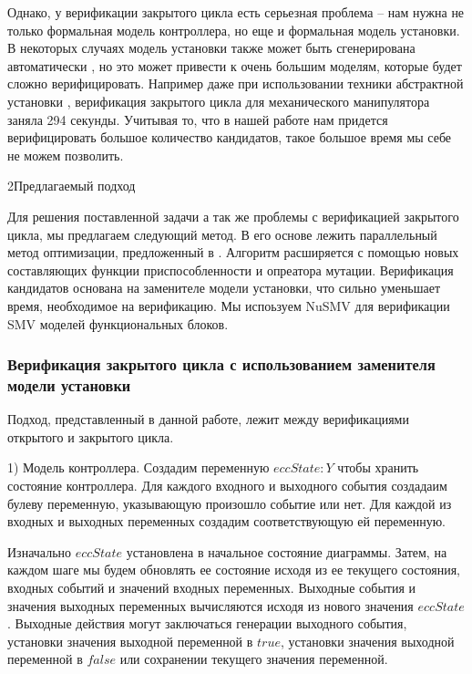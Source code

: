\documentclass[14pt]{extarticle}
\makeatletter
\theoremstyle{plain}
\theoremstyle{definition}
\renewcommand{\subsection}{\@startsection{subsection}{2}{0mm}%
{2\baselineskip}{\baselineskip}{\bfseries\large\itshape}}
\makeatother
\begin{document}
Однако, у верификации закрытого цикла есть серьезная проблема -- нам нужна не
только формальная модель контроллера, но еще и формальная модель установки.
В некоторых случаях модель установки также может быть сгенерирована
автоматически \cite{dd}, но это может привести к очень большим моделям, которые будет
сложно верифицировать. Например даже при использовании техники абстрактной
установки \cite{dd}, верификация закрытого цикла для механического манипулятора заняла
294 секунды. Учитывая то, что в нашей работе нам придется верифицировать
большое количество кандидатов, такое большое время мы себе не можем позволить.

\subsection{Предлагаемый подход}

Для решения поставленной задачи а так же проблемы с верификацией закрытого
цикла, мы предлагаем следующий метод.  В его основе лежить параллельный
метод оптимизации, предложенный в \cite{rec}. Алгоритм расширяется с помощью новых
составляющих функции приспособленности и опреатора мутации. Верификация
кандидатов основана на заменителе модели установки, что сильно уменьшает время,
необходимое на верификацию. Мы испоьзуем NuSMV \cite{nusmv} для верификации SMV моделей
функциональных блоков.

\subsubsection{Верификация закрытого цикла с использованием заменителя модели
установки}

Подход, представленный в данной работе, лежит между верификациями открытого и
закрытого цикла. 

1) Модель контроллера. Создадим переменную $eccState : Y$ чтобы хранить
состояние контроллера. Для каждого входного и выходного события создадаим
булеву переменную, указывающую произошло событие или нет. Для каждой из
входных и выходных переменных создадим соответствующую ей переменную.

Изначально $eccState$ установлена в начальное состояние диаграммы. Затем, на
каждом шаге мы будем обновлять ее состояние исходя из ее текущего состояния,
входных событий и значений входных переменных. Выходные события и значения
выходных переменных вычисляются исходя из нового значения $eccState$. Выходные
действия могут заключаться генерации выходного события, установки значения
выходной переменной в $true$, установки значения выходной переменной в $false$
или сохранении текущего значения переменной.
\end{document}
